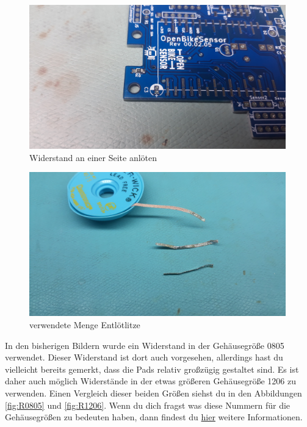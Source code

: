 \documentclass[12pt, a4paper]{article}		%
\begin{document}
\begin{minipage}[t]{0.49\textwidth}
\begin{figure}[H]
	\centering
		\includegraphics[width=0.99\textwidth]{Grafiken/20200922_185449.jpg}
	\caption{Widerstand an einer Seite anlöten}
	\label{fig:20200922_185449}
\end{figure}  
\end{minipage}
\begin{minipage}[t]{0.49\textwidth}
\begin{figure}[H]
	\centering
		\includegraphics[width=0.99\textwidth]{Grafiken/20200726_184519.jpg}
	\caption{verwendete Menge Entlötlitze}
	\label{fig:20200726_184519}
\end{figure}
\end{minipage}
\newline

In den bisherigen Bildern wurde ein Widerstand in der Gehäusegröße 0805 verwendet. Dieser Widerstand ist dort auch vorgesehen, allerdings hast du vielleicht bereits gemerkt, dass die Pads relativ großzügig gestaltet sind. Es ist daher auch möglich Widerstände in der etwas größeren Gehäusegröße 1206 zu verwenden. Einen Vergleich dieser beiden Größen siehst du in den Abbildungen \ref{fig:R0805} und \ref{fig:R1206}. Wenn du dich fragst was diese Nummern für die Gehäusegrößen zu bedeuten haben, dann findest du \href{https://de.wikipedia.org/wiki/Chip-Bauform}{hier} weitere Informationen.
\end{document}
